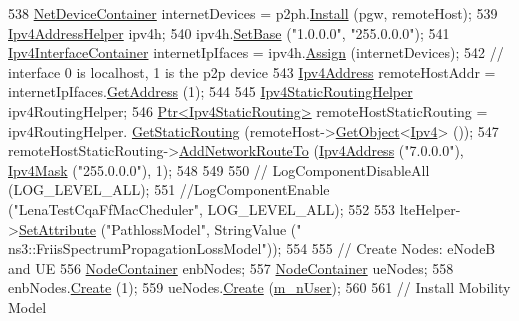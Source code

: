 \begin{DoxyCode}
538   \hyperlink{classns3_1_1NetDeviceContainer}{NetDeviceContainer} internetDevices = p2ph.\hyperlink{classns3_1_1PointToPointHelper_ab9162fea3e88722666fed1106df1f9ec}{Install} (pgw, remoteHost);
539   \hyperlink{classns3_1_1Ipv4AddressHelper}{Ipv4AddressHelper} ipv4h;
540   ipv4h.\hyperlink{classns3_1_1Ipv4AddressHelper_acf7b16dd25bac67e00f5e25f90a9a035}{SetBase} (\textcolor{stringliteral}{"1.0.0.0"}, \textcolor{stringliteral}{"255.0.0.0"});
541   \hyperlink{classns3_1_1Ipv4InterfaceContainer}{Ipv4InterfaceContainer} internetIpIfaces = ipv4h.\hyperlink{classns3_1_1Ipv4AddressHelper_af8e7f4a1a7e74c00014a1eac445a27af}{Assign} (internetDevices);
542   \textcolor{comment}{// interface 0 is localhost, 1 is the p2p device}
543   \hyperlink{classns3_1_1Ipv4Address}{Ipv4Address} remoteHostAddr = internetIpIfaces.\hyperlink{classns3_1_1Ipv4InterfaceContainer_ae63208dcd222be986822937ee4aa828c}{GetAddress} (1);
544 
545   \hyperlink{classns3_1_1Ipv4StaticRoutingHelper}{Ipv4StaticRoutingHelper} ipv4RoutingHelper;
546   \hyperlink{classns3_1_1Ptr}{Ptr<Ipv4StaticRouting>} remoteHostStaticRouting = ipv4RoutingHelper.
      \hyperlink{classns3_1_1Ipv4StaticRoutingHelper_a731206e50d305695dac7fb2ef963a4bb}{GetStaticRouting} (remoteHost->\hyperlink{classns3_1_1Object_a13e18c00017096c8381eb651d5bd0783}{GetObject}<\hyperlink{classns3_1_1Ipv4}{Ipv4}> ());
547   remoteHostStaticRouting->\hyperlink{classns3_1_1Ipv4StaticRouting_a8bf5eaa7ba49fe33c78c70d5560b6c39}{AddNetworkRouteTo} (\hyperlink{classns3_1_1Ipv4Address}{Ipv4Address} (\textcolor{stringliteral}{"7.0.0.0"}), 
      \hyperlink{classns3_1_1Ipv4Mask}{Ipv4Mask} (\textcolor{stringliteral}{"255.0.0.0"}), 1);
548 
549 
550 \textcolor{comment}{//   LogComponentDisableAll (LOG\_LEVEL\_ALL);}
551   \textcolor{comment}{//LogComponentEnable ("LenaTestCqaFfMacCheduler", LOG\_LEVEL\_ALL);}
552    
553   lteHelper->\hyperlink{classns3_1_1ObjectBase_ac60245d3ea4123bbc9b1d391f1f6592f}{SetAttribute} (\textcolor{stringliteral}{"PathlossModel"}, StringValue (\textcolor{stringliteral}{"
      ns3::FriisSpectrumPropagationLossModel"}));
554 
555   \textcolor{comment}{// Create Nodes: eNodeB and UE}
556   \hyperlink{classns3_1_1NodeContainer}{NodeContainer} enbNodes;
557   \hyperlink{classns3_1_1NodeContainer}{NodeContainer} ueNodes;
558   enbNodes.\hyperlink{classns3_1_1NodeContainer_a787f059e2813e8b951cc6914d11dfe69}{Create} (1);
559   ueNodes.\hyperlink{classns3_1_1NodeContainer_a787f059e2813e8b951cc6914d11dfe69}{Create} (\hyperlink{classLenaCqaFfMacSchedulerTestCase2_a335a7e080f06c9fed2a1b431389615f1}{m\_nUser});
560 
561   \textcolor{comment}{// Install Mobility Model}

\end{DoxyCode}
